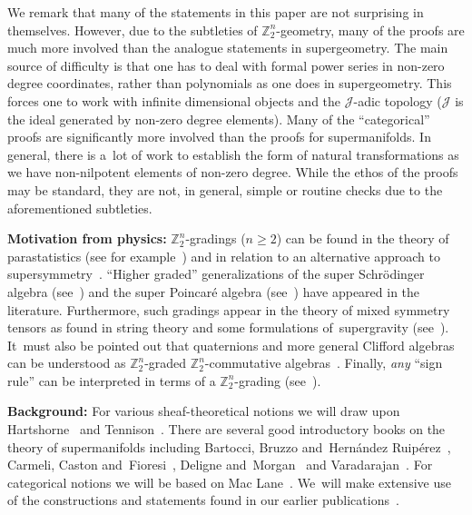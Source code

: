 \documentclass[10pt,a4paper]{amsart}
\newcommand{\Z}{{\mathbb Z}}
\newcommand{\0}{\otimes}
\numberwithin{equation}{section}
\begin{document}
We remark that many of the statements in this paper are not surprising in themselves. However, due to the subtleties of $\Z_2^n$-geometry, many of the proofs are much more involved than the analogue statements in supergeometry. The main source of difficulty is that one has to deal with formal power series in non-zero degree coordinates, rather than polynomials as one does in supergeometry. This forces one to work with infinite dimensional objects and the $\mathcal{J}$-adic topology ($\mathcal{J}$ is the ideal generated by non-zero degree elements). Many of the ``categorical'' proofs are significantly more involved than the proofs for supermanifolds. In general, there is a~lot of work to establish the form of natural transformations as we have non-nilpotent elements of non-zero degree. While the ethos of the proofs may be standard, they are not, in general, simple or routine checks due to the aforementioned subtleties.


\textbf{Motivation from physics:} $\Z_{2}^{n}$-gradings ($n \geq 2$) can be found in the theory of parastatistics (see for example~\cite{Druhl:1970,Green:1953,Greenberg:1965,Yang:2001}) and in relation to an alternative approach to supersymmetry~\cite{Aizawa:2018,Aizawa:2016,Tolstoy:2013}. ``Higher graded'' generalizations of the super Schr\"{o}dinger algebra (see~\cite{Aizawa:2017}) and the super Poincar\'{e} algebra (see~\cite{Bruce:2019a}) have appeared in the literature. Furthermore, such gradings appear in the theory of mixed symmetry tensors as found in string theory and some formulations of~supergravity (see~\cite{Bruce:2018a}). It~must also be pointed out that quaternions and more general Clifford algebras can be understood as $\Z_2^n$-graded $\Z_2^n$-commutative algebras~\cite{Albuquerque:1999, Albuquerque:2002}. Finally, \emph{any} ``sign rule'' can be interpreted in terms of a $\Z_{2}^{n}$-grading (see~\cite{Covolo:2016}).

 \textbf{Background:} For various sheaf-theoretical notions we will draw upon Hartshorne~\cite[Chapter~II]{Hartshorne:1977} and Tennison~\cite{Tennison:1975}. There are several good introductory books on the theory of super\-ma\-ni\-folds including Bartocci, Bruzzo and~Hern\'{a}ndez Ruip\'{e}rez~\cite{Bartocci:1991}, Carmeli, Caston and~Fioresi~\cite{Carmeli:2011}, Deligne and~Morgan~\cite{Deligne:1999} and Varadarajan~\cite{Varadarajan:2004}. For categorical notions we will be based on Mac Lane~\cite{MacLane1998}. We~will make extensive use of the constructions and statements found in our earlier publications~\cite{Bruce:2019b,Bruce:2018,Bruce:2019}.
\end{document}

